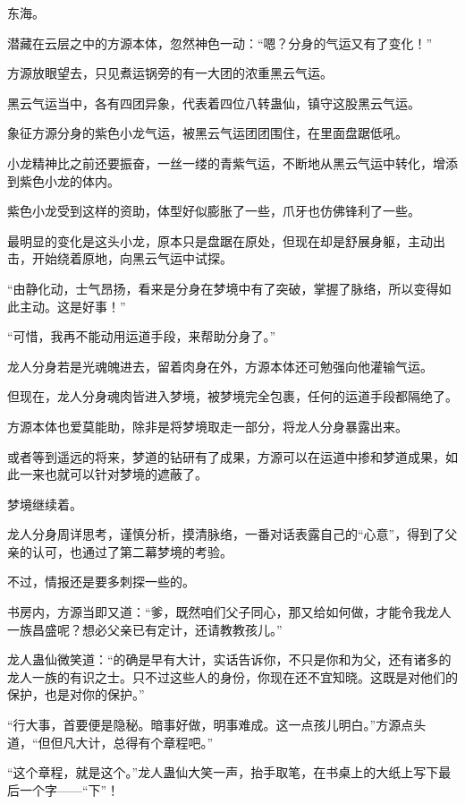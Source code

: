 
\begin{this_body}

东海。

潜藏在云层之中的方源本体，忽然神色一动：“嗯？分身的气运又有了变化！”

方源放眼望去，只见煮运锅旁的有一大团的浓重黑云气运。

黑云气运当中，各有四团异象，代表着四位八转蛊仙，镇守这股黑云气运。

象征方源分身的紫色小龙气运，被黑云气运团团围住，在里面盘踞低吼。

小龙精神比之前还要振奋，一丝一缕的青紫气运，不断地从黑云气运中转化，增添到紫色小龙的体内。

紫色小龙受到这样的资助，体型好似膨胀了一些，爪牙也仿佛锋利了一些。

最明显的变化是这头小龙，原本只是盘踞在原处，但现在却是舒展身躯，主动出击，开始绕着原地，向黑云气运中试探。

“由静化动，士气昂扬，看来是分身在梦境中有了突破，掌握了脉络，所以变得如此主动。这是好事！”

“可惜，我再不能动用运道手段，来帮助分身了。”

龙人分身若是光魂魄进去，留着肉身在外，方源本体还可勉强向他灌输气运。

但现在，龙人分身魂肉皆进入梦境，被梦境完全包裹，任何的运道手段都隔绝了。

方源本体也爱莫能助，除非是将梦境取走一部分，将龙人分身暴露出来。

或者等到遥远的将来，梦道的钻研有了成果，方源可以在运道中掺和梦道成果，如此一来也就可以针对梦境的遮蔽了。

梦境继续着。

龙人分身周详思考，谨慎分析，摸清脉络，一番对话表露自己的“心意”，得到了父亲的认可，也通过了第二幕梦境的考验。

不过，情报还是要多刺探一些的。

书房内，方源当即又道：“爹，既然咱们父子同心，那又给如何做，才能令我龙人一族昌盛呢？想必父亲已有定计，还请教教孩儿。”

龙人蛊仙微笑道：“的确是早有大计，实话告诉你，不只是你和为父，还有诸多的龙人一族的有识之士。只不过这些人的身份，你现在还不宜知晓。这既是对他们的保护，也是对你的保护。”

“行大事，首要便是隐秘。暗事好做，明事难成。这一点孩儿明白。”方源点头道，“但但凡大计，总得有个章程吧。”

“这个章程，就是这个。”龙人蛊仙大笑一声，抬手取笔，在书桌上的大纸上写下最后一个字——“下”！


\end{this_body}
